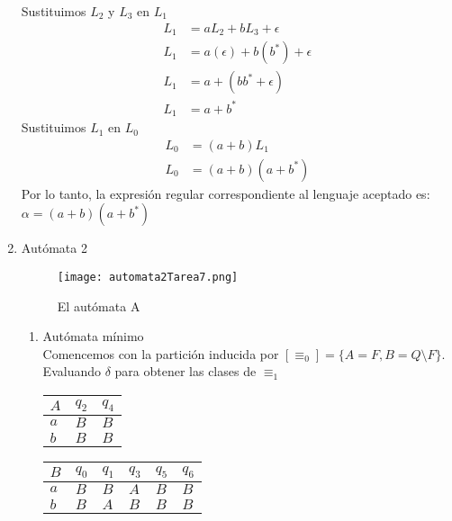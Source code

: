\documentclass{article}
\begin{document}
\begin{enumerate}
{\begin{enumerate}
{    			Sustituimos $L_{2}$ y $L_{3}$ en $L_{1}$
    			\begin{align*}
    				L_{1} &= aL_{2} + bL_{3} + \epsilon\\
    				L_{1} &= a(\epsilon) + b(b^*) + \epsilon\\
    				L_{1} &= a + (bb^* + \epsilon)\\
    				L_{1} &= a + b^*
    			\end{align*}
    			Sustituimos $L_{1}$ en $L_{0}$
    			\begin{align*}
    				L_{0} &= (a+b)L_{1}\\
    				L_{0} &= (a+b)(a + b^*)
    			\end{align*}
    			Por lo tanto, la expresión regular correspondiente al lenguaje aceptado es: $\alpha = (a+b)(a + b^*)$
    		}
    			\end{enumerate}
			}
    	\item {
    		Autómata 2
    		\begin{figure} [H]
    			\centering
    			\texttt{[image: automata2Tarea7.png]}
    			\caption{El autómata A}
    		\end{figure}
    
            \begin{enumerate}
                \item {
                Autómata mínimo\\
                Comencemos con la partición inducida por $[\equiv_{0}] = 
                \{A = F, B = Q \setminus F\}$.\\
                Evaluando $\delta$ para obtener las clases de $\equiv_{1}$
                
                    \begin{table}[H]
                        \centering
                        \begin{tabular}{|l|l|l|}
                            \hline
                            $A$ & $q_{2}$ & $q_4$ \\ \hline
                            $a$      & $B$     & $B$   \\ \hline
                            $b$      & $B$     & $B$   \\ \hline
                        \end{tabular}
                        \quad
                        \begin{tabular}{|l|l|l|l|l|l|}
                            \hline
                            $B$ & $q_{0}$ & $q_{1}$ & $q_{3}$ & $q_{5}$ & $q_{6}$ \\ \hline
                            $a$      & $B$     & $B$     & $A$     & $B$     & $B$     \\ \hline
                            $b$      & $B$     & $A$     & $B$     & $B$     & $B$     \\ \hline
                        \end{tabular}
                    \end{table}

}
\end{enumerate}}
\end{enumerate}
\end{document}
